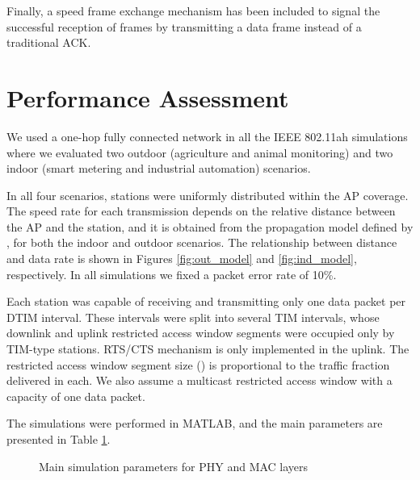 \documentclass[]{article}
\begin{document}
Finally, a speed frame exchange \cite{Draft802.11ah} mechanism has been included to signal the successful reception of frames by transmitting a data frame instead of a traditional ACK.



\section{Performance Assessment}
\label{proposal}

We used a one-hop fully connected network in all the IEEE 802.11ah simulations where we evaluated two outdoor (agriculture and animal monitoring) and two indoor (smart metering and industrial automation) scenarios.





In all four scenarios, stations were uniformly distributed within the AP coverage. The speed rate for each transmission depends on the relative distance between the AP and the station, and it is obtained from the propagation model defined by \cite{Hazmi2012}, for both the indoor and outdoor scenarios. The relationship between distance and data rate is shown in Figures \ref{fig:out_model} and \ref{fig:ind_model}, respectively. In all simulations we fixed a packet error rate of 10\%.

Each station was capable of receiving and transmitting only one data packet per DTIM interval. These intervals were split into several TIM intervals, whose downlink and uplink restricted access window segments were occupied only by TIM-type stations. RTS/CTS mechanism is only implemented in the uplink. The restricted access window segment size () is proportional to the traffic fraction  delivered in each. We also assume a multicast restricted access window with a capacity of one data packet.

The simulations were performed in MATLAB, and the main parameters are presented in Table \ref{fig:sim_param}.

\renewcommand{\figurename}{Table}\setcounter{figure}{1}
\begin{figure}
\begin{center}
\end{center}
\caption{Main simulation parameters for PHY and MAC layers}
\label{fig:sim_param}
\end{figure}
\end{document}
